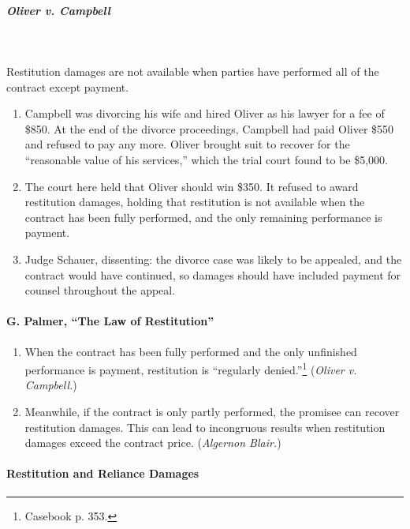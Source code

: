 \paragraph{\emph{Oliver v. Campbell}}
~\\\\
Restitution damages are not available when parties have performed all of the 
contract except payment.

\begin{enumerate}
    \item Campbell was divorcing his wife and hired Oliver as his lawyer for a 
    fee of \$850. At the end of the divorce proceedings, Campbell had paid 
    Oliver \$550 and refused to pay any more. Oliver brought suit to recover 
    for the ``reasonable value of his services,'' which the trial court found 
    to be \$5,000. 
    \item The court here held that Oliver should win \$350. It refused to 
    award restitution damages, holding that restitution is not available when 
    the contract has been fully performed, and the only remaining performance 
    is payment.
    \item Judge Schauer, dissenting: the divorce case was likely to be 
    appealed, and the contract would have continued, so damages should have 
    included payment for counsel throughout the appeal.
\end{enumerate}

\paragraph{G. Palmer, ``The Law of Restitution''}

\begin{enumerate}
    \item When the contract has been fully performed and the only unfinished 
    performance is payment, restitution is ``regularly 
    denied.''\footnote{Casebook p. 353.} (\emph{Oliver v. Campbell.})
    \item Meanwhile, if the contract is only partly performed, the promisee 
    can recover restitution damages. This can lead to incongruous results when 
    restitution damages exceed the contract price. (\emph{Algernon Blair.})
\end{enumerate}

\paragraph{Restitution and Reliance Damages}

